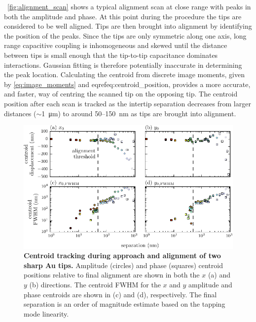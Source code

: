 \documentclass{article}
\begin{document}
\figurename~\ref{fig:alignment_scan} shows a typical alignment scan at close range with peaks in both the amplitude and phase. At this point during the procedure the tips are considered to be well aligned. Tips are then brought into alignment by identifying the position of the peaks. Since the tips are only symmetric along one axis, long range capacitive coupling is inhomogeneous and skewed until the distance between tips is small enough that the tip-to-tip capacitance dominates interactions. Gaussian fitting is therefore potentially inaccurate in determining the peak location. Calculating the centroid from discrete image moments, given by \eqref{eq:image_moments} and eqref{eq:centroid_position}, provides a more accurate, and faster, way of centring the scanned tip on the opposing tip. The centroid position after each scan is tracked as the intertip separation decreases from larger distances ($\sim$\SI{1}{\micro\metre}) to around 50--\SI{150}{nm} as tips are brought into alignment.

\begin{figure}[bt]
\centering
\includegraphics{figures/centroid_tracking}
\caption[Centroid tracking during approach and alignment of two sharp Au tips]{\textbf{Centroid tracking during approach and alignment of two sharp Au tips.} Amplitude (circles) and phase (squares) centroid positions relative to final alignment are shown in both the $x$ (a) and $y$ (b) directions. The centroid FWHM for the $x$ and $y$ amplitude and phase centroids are shown in (c) and (d), respectively. The final separation is an order of magnitude estimate based on the tapping mode linearity.}
\label{fig:centroid_tracking}
\end{figure}
\end{document}
